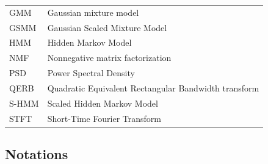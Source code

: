 \documentclass{article}
\begin{document}
\begin{tabular}{ll}
GMM    & Gaussian mixture model \\
GSMM   & Gaussian Scaled Mixture Model \\
HMM    & Hidden Markov Model \\
NMF    & Nonnegative matrix factorization \\
PSD    & Power Spectral Density \\
QERB   & Quadratic Equivalent Rectangular Bandwidth transform\\
S-HMM  & Scaled Hidden Markov Model \\
STFT   & Short-Time Fourier Transform \\
\end{tabular}


\subsection{Notations}
\end{document}
